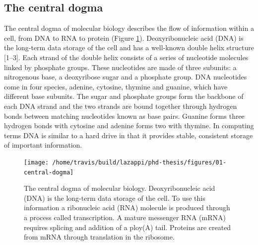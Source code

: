 \documentclass[11pt,a4paper,titlepage,twoside,openright]{style/unimelbthesis}
\theoremstyle{definition}
\theoremstyle{definition}
\theoremstyle{definition}
\theoremstyle{remark}
\begin{document}
\begin{mainmatter}
\hypertarget{intro-dogma}{%
\section{The central dogma}\label{intro-dogma}}

The central dogma of molecular biology describes the flow of information within a cell, from DNA to RNA to protein (Figure \ref{fig:central-dogma}). Deoxyribonucleic acid (DNA) is the long-term data storage of the cell and has a well-known double helix structure {[}1--3{]}. Each strand of the double helix consists of a series of nucleotide molecules linked by phosphate groups. These nucleotides are made of three subunits: a nitrogenous base, a deoxyribose sugar and a phosphate group. DNA nucleotides come in four species, adenine, cytosine, thymine and guanine, which have different base subunits. The sugar and phosphate groups form the backbone of each DNA strand and the two strands are bound together through hydrogen bonds between matching nucleotides known as base pairs. Guanine forms three hydrogen bonds with cytosine and adenine forms two with thymine. In computing terms DNA is similar to a hard drive in that it provides stable, consistent storage of important information.

\begin{figure}

{\centering \texttt{[image: /home/travis/build/lazappi/phd-thesis/figures/01-central-dogma]} 

}

\caption[The central dogma of molecular biology.]{The central dogma of molecular biology. Deoxyribonucleic acid (DNA) is the long-term data storage of the cell. To use this information a ribonucleic acid (RNA) molecule is produced through a process called transcription. A mature messenger RNA (mRNA) requires splicing and addition of a ploy(A) tail. Proteins are created from mRNA through translation in the ribosome.}\label{fig:central-dogma}
\end{figure}






\end{mainmatter}
\end{document}
